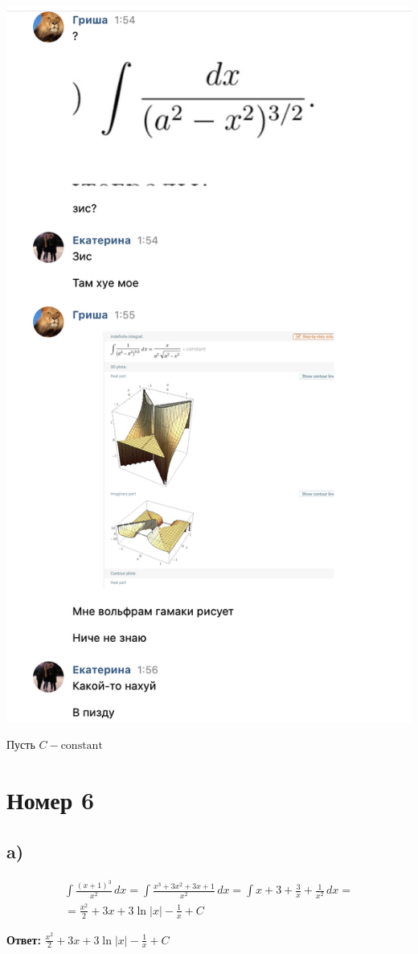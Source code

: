 \documentclass[a4paper,12pt]{article}
\begin{document}
\begin{center}
\includegraphics[scale=0.8]{e.png}
\end{center}
\clearpage
Пусть $C - \text{constant} $
\section*{Номер 6}
\subsection*{a)}
\begin{equation*}
\begin{gathered}
\int \frac{(x+1)^3}{x^2} \,dx = \int \frac{x^3 + 3x^2 + 3x + 1}{x^2} \,dx = \int x + 3 + \frac{3}{x} + \frac{1}{x^2} \,dx = \\
=
\frac{x^2}{2} + 3x + 3\ln |x| - \frac{1}{x} + C
\end{gathered}
\end{equation*}
{\Large \begin{center}
\textbf{Ответ: } $\frac{x^2}{2} + 3x + 3\ln |x| - \frac{1}{x} + C$
\end{center}}
\end{document}
